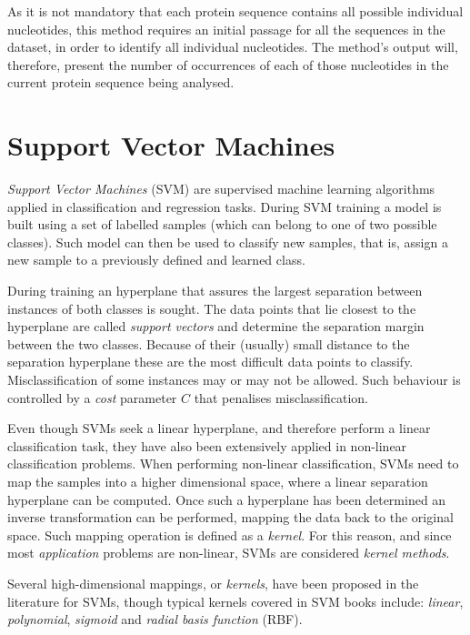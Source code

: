 \documentclass[11pt]{article}
\begin{document}
As it is not mandatory that each protein sequence contains all possible individual nucleotides, this method requires an initial passage for all the sequences in the dataset, in order to identify all individual nucleotides. The method's output will, therefore, present the number of occurrences of each of those nucleotides in the current protein sequence being analysed.

\section{Support Vector Machines}
\label{svm}

\emph{Support Vector Machines} (SVM) \cite{cortes1995support} are supervised machine learning algorithms applied in classification and regression tasks. During SVM training a model is built using a set of labelled samples (which can belong to one of two possible classes). Such model can then be used to classify new samples, that is, assign a new sample to a previously defined and learned class.

During training an hyperplane that assures the largest separation between instances of both classes is sought. The data points that lie closest to the hyperplane are called \emph{support vectors} and determine the separation margin between the two classes. Because of their (usually) small distance to the separation hyperplane these are the most difficult data points to classify. Misclassification of some instances may or may not be allowed. Such behaviour is controlled by a \emph{cost} parameter $C$ that penalises misclassification.

Even though SVMs seek a linear hyperplane, and therefore perform a linear classification task, they have also been extensively applied in non-linear classification problems. When performing non-linear classification, SVMs need to map the samples into a higher dimensional space, where a linear separation hyperplane can be computed. Once such a hyperplane has been determined an inverse transformation can be performed, mapping the data back to the original space. Such mapping operation is defined as a \emph{kernel}. For this reason, and since most \emph{application} problems are non-linear, SVMs are considered \emph{kernel methods}.

Several high-dimensional mappings, or \emph{kernels}, have been proposed in the literature for SVMs, though typical kernels covered in SVM books include: \emph{linear}, \emph{polynomial}, \emph{sigmoid} and \emph{radial basis function} (RBF).
\end{document}
